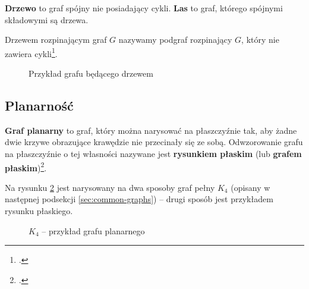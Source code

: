 \textbf{Drzewo} to graf spójny nie posiadający cykli. \textbf{Las} to graf, którego spójnymi składowymi są drzewa.

Drzewem rozpinającym graf $G$ nazywamy podgraf rozpinający $G$, który nie zawiera cykli\footcite[10]{wilson-beineke}. 

\begin{figure}[h]
\centering
{}
\caption{Przykład grafu będącego drzewem} \label{fig:tree-example}
\end{figure}

\subsection*{Planarność}

\textbf{Graf planarny} to graf, który można narysować na płaszczyźnie tak, aby żadne dwie krzywe obrazujące krawędzie nie przecinały się ze sobą. Odwzorowanie grafu na płaszczyźnie o tej własności nazywane jest \textbf{rysunkiem płaskim} (lub \textbf{grafem płaskim})\footcite[82]{wilson}. 

Na rysunku \ref{fig:planar-graph-example} jest narysowany na dwa sposoby graf pełny $K_4$ (opisany w następnej podsekcji \ref{sec:common-graphs}) -- drugi sposób jest przykładem rysunku płaskiego. 

\begin{figure}[h]
\centering
{}
\caption{$K_4$ -- przykład grafu planarnego} \label{fig:planar-graph-example}
\end{figure}